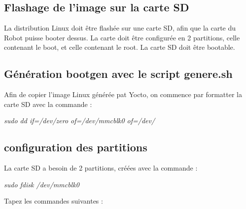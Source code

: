 \subsection{Flashage de l’image sur la carte SD}

La distribution Linux doit être flashée sur une carte SD, afin que la carte du Robot puisse booter dessus.
La carte doit être configurée en 2 partitions, celle contenant le boot, et celle contenant le root.
La carte SD doit être bootable.

\subsection{Génération bootgen avec le script genere.sh}
Afin de copier l'image Linux générée pat Yocto, on commence par formatter la carte SD avec la commande : 

\textit{sudo dd if=/dev/zero of=/dev/mmcblk0 of=/dev/
}
\subsection{configuration des partitions}

La carte SD a besoin de 2 partitions, créées avec la commande : 

\textit{sudo fdisk /dev/mmcblk0
}


Tapez les commandes suivantes : 


